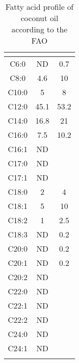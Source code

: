 \begin{table}
	\caption{Fatty acid profile of coconut oil according to the FAO \autocite{JFAOWHOCAC2019}}
	\label{tab:CoconutFAO}
	\centering
\begin{tabular}{c|c|c}
\toprule
	\tabhead{Fatty acid} & \tabhead{Lower} &   	\autocite{Upper}	\\
	\midrule
C6:0	&ND&	0.7	\\
C8:0	&4.6	&10\\
C10:0	&5	&8	\\
C12:0	&45.1	&53.2	\\
C14:0	&16.8	&21	\\
C16:0	&7.5	&10.2	\\
C16:1	&ND	&	\\
C17:0	&ND	&	\\
C17:1	&ND	&	\\
C18:0	&2	&4	\\
C18:1	&5	&10	\\
C18:2	&1	&2.5	\\
C18:3	&ND	&0.2	\\
C20:0	&ND	&0.2	\\
C20:1	&ND	&0.2	\\
C20:2	&ND	&	\\
C22:0	&ND	&	\\
C22:1	&ND	&	\\
C22:2	&ND	&	\\
C24:0	&ND	&	\\
C24:1	&ND	&	\\
	\bottomrule\\
\end{tabular}
\end{table}
